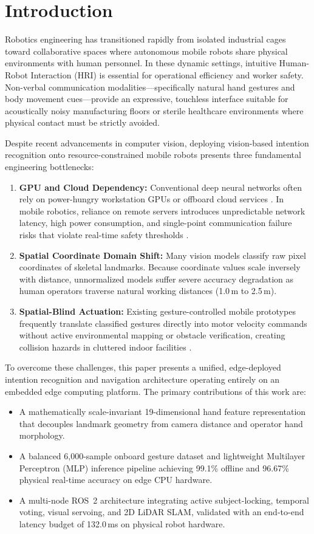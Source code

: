 \documentclass[conference]{IEEEtran}
\begin{document}
\section{Introduction}
Robotics engineering has transitioned rapidly from isolated industrial cages toward collaborative spaces where autonomous mobile robots share physical environments with human personnel. In these dynamic settings, intuitive Human-Robot Interaction (HRI) is essential for operational efficiency and worker safety. Non-verbal communication modalities—specifically natural hand gestures and body movement cues—provide an expressive, touchless interface suitable for acoustically noisy manufacturing floors or sterile healthcare environments where physical contact must be strictly avoided.

Despite recent advancements in computer vision, deploying vision-based intention recognition onto resource-constrained mobile robots presents three fundamental engineering bottlenecks:
\begin{enumerate}
    \item \textbf{GPU and Cloud Dependency:} Conventional deep neural networks often rely on power-hungry workstation GPUs or offboard cloud services \cite{mahmud2022}. In mobile robotics, reliance on remote servers introduces unpredictable network latency, high power consumption, and single-point communication failure risks that violate real-time safety thresholds \cite{tsitos2022}.
    \item \textbf{Spatial Coordinate Domain Shift:} Many vision models classify raw pixel coordinates of skeletal landmarks. Because coordinate values scale inversely with distance, unnormalized models suffer severe accuracy degradation as human operators traverse natural working distances (1.0\,m to 2.5\,m).
    \item \textbf{Spatial-Blind Actuation:} Existing gesture-controlled mobile prototypes frequently translate classified gestures directly into motor velocity commands without active environmental mapping or obstacle verification, creating collision hazards in cluttered indoor facilities \cite{li2023}.
\end{enumerate}

To overcome these challenges, this paper presents a unified, edge-deployed intention recognition and navigation architecture operating entirely on an embedded edge computing platform. The primary contributions of this work are:
\begin{itemize}
    \item A mathematically scale-invariant 19-dimensional hand feature representation that decouples landmark geometry from camera distance and operator hand morphology.
    \item A balanced 6,000-sample onboard gesture dataset and lightweight Multilayer Perceptron (MLP) inference pipeline achieving 99.1\% offline and 96.67\% physical real-time accuracy on edge CPU hardware.
    \item A multi-node ROS~2 architecture integrating active subject-locking, temporal voting, visual servoing, and 2D LiDAR SLAM, validated with an end-to-end latency budget of 132.0\,ms on physical robot hardware.
\end{itemize}
\end{document}
